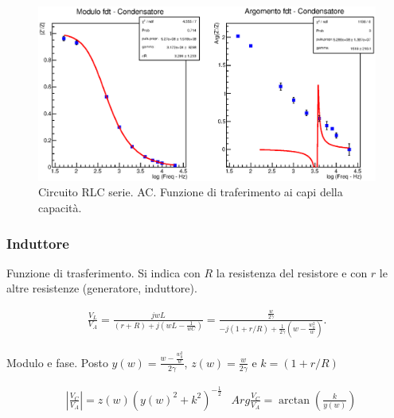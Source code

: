 

\begin{figure}[H]
\centering
\includegraphics[scale=0.75]{Grafici/C4_P2_Cond.eps}
\caption{
Circuito RLC serie.
AC.
Funzione di traferimento ai capi della capacità.
}
\label{fig:C4_P2_Cond}
\end{figure}








\subsubsection{Induttore}

Funzione di trasferimento.
Si indica con $R$ la resistenza del resistore e con $r$ le altre resistenze (generatore, induttore).

\begin{align*}
\frac{V_{L}}{V_{A}} 
= \frac{jwL}{ (r+R) + j(wL - \frac{1}{wC}) }
= 
\frac{\frac{w}{2\gamma}}
{ -j(1+r/R) + \frac{1}{2\gamma}( w-\frac{w_0^2}{w}) }.
\end{align*}

Modulo e fase.
Posto
$ y(w) = \frac{w - \frac{w_0^2}{w}}{2\gamma} $,
$ z(w) = \frac{w}{2\gamma} $ e 
$ k = (1+r/R)$

\begin{align*}
& |\frac{V_{C}}{V_{A}}|  = z(w)( y(w)^2 + k^2)^{-\frac{1}{2}}
& Arg\frac{V_{C}}{V_{A}} = \arctan( \frac{k}{y(w)} )
\end{align*}




